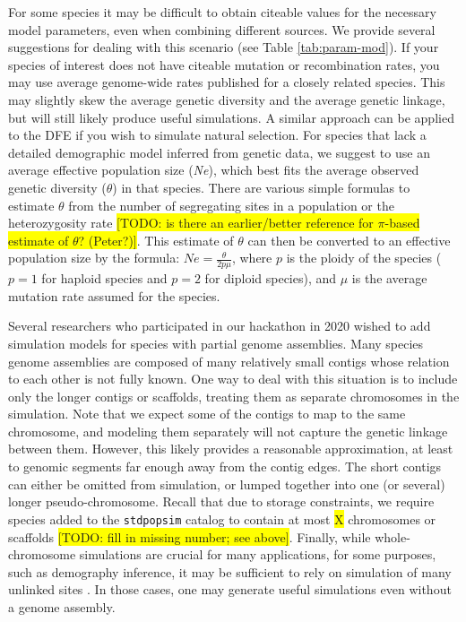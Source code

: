 \documentclass[hidelinks]{article}
\begin{document}
For some species it may be difficult to obtain citeable values for the necessary model parameters, even when combining different sources. We provide several suggestions for dealing with this scenario (see Table \ref{tab:param-mod}).
If your species of interest does not have citeable mutation or recombination rates, you may use average genome-wide rates published for a closely related species. This may slightly skew the average genetic diversity and the average genetic linkage, but will still likely produce useful simulations. A similar approach can be applied to the DFE if you wish to simulate natural selection.
For species that lack a detailed demographic model inferred from genetic data, we suggest to use an average effective population size (\emph{Ne}), which best fits the average observed genetic diversity ($\theta$) in that species. There are various simple formulas to estimate $\theta$ from the number of segregating sites in a population \citep{Watterson1975} or the heterozygosity rate \citep{Tajima1989} \colorbox{yellow}{[TODO: is there an earlier/better reference for $\pi$-based estimate of $\theta$? (Peter?)]}. This estimate of $\theta$ can then be converted to an effective population size by the formula: $Ne=\frac {\theta} {2p\mu}$, where $p$ is the ploidy of the species ($p=1$ for haploid species and $p=2$ for diploid species), and $\mu$ is the average mutation rate assumed for the species.

Several researchers who participated in our hackathon in 2020 wished to add simulation models for species with partial genome assemblies. Many species genome assemblies
are composed of many relatively small contigs whose relation to each
other is not fully known. One way to deal with this situation is to include only the  longer contigs or scaffolds, treating them as separate chromosomes in the simulation. Note that we expect some of the contigs to map to the same chromosome, and modeling them separately will not capture the genetic linkage between them. However, this likely provides a reasonable approximation, at least to genomic segments far enough away from the contig edges. The short contigs can either be omitted from simulation, or lumped together into one (or several) longer pseudo-chromosome. Recall that due to storage constraints, we require species added to the \texttt{stdpopsim} catalog to contain at most \colorbox{yellow}{X} chromosomes or scaffolds \colorbox{yellow}{[TODO: fill in missing number; see above]}. Finally, while whole-chromosome simulations are crucial for many applications, for some purposes, such as demography inference, it may be sufficient to rely on simulation  of many unlinked sites \citep{Gutenkunst2009,Excoffier2013}. In those cases, one may generate useful simulations even without a genome assembly.
\end{document}

